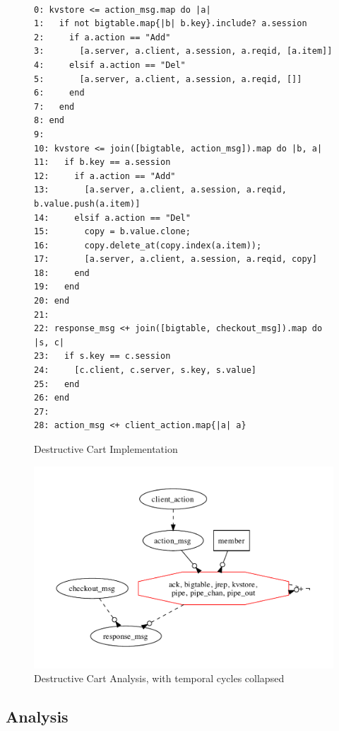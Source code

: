 \begin{figure}[t]
\begin{scriptsize}
\begin{verbatim}

0: kvstore <= action_msg.map do |a|
1:   if not bigtable.map{|b| b.key}.include? a.session
2:     if a.action == "Add"
3:       [a.server, a.client, a.session, a.reqid, [a.item]]
4:     elsif a.action == "Del"
5:       [a.server, a.client, a.session, a.reqid, []]
6:     end
7:   end
8: end
9: 
10: kvstore <= join([bigtable, action_msg]).map do |b, a|
11:   if b.key == a.session
12:     if a.action == "Add"
13:       [a.server, a.client, a.session, a.reqid, b.value.push(a.item)]
14:     elsif a.action == "Del"
15:       copy = b.value.clone;
16:       copy.delete_at(copy.index(a.item));
17:       [a.server, a.client, a.session, a.reqid, copy]
18:     end
19:   end
20: end
21:
22: response_msg <+ join([bigtable, checkout_msg]).map do |s, c|
23:   if s.key == c.session
24:     [c.client, c.server, s.key, s.value]
25:   end
26: end
27: 
28: action_msg <+ client_action.map{|a| a}
\end{verbatim}
\end{scriptsize}
\caption{Destructive Cart Implementation}
\label{tab:pdg-destructive}
\end{figure}

\begin{figure}[t]
\centering
\includegraphics[width=0.9\linewidth]{fig/destructive.pdf}

\caption{Destructive Cart Analysis, with temporal cycles collapsed}
\label{fig:pdg-destructive-analysis}
\end{figure}


\subsection{Analysis}

